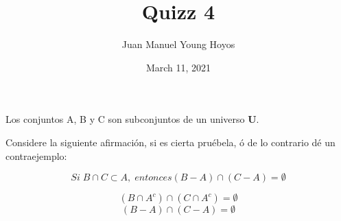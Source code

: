\documentclass[12pt, letterpaper, twoside]{article}
\title{Quizz 4}
\author{Juan Manuel Young Hoyos}
\date{March 11, 2021}
\begin{document}
\maketitle

Los conjuntos A, B y C son subconjuntos de un universo \textbf{U}.

Considere la siguiente afirmación, si es cierta pruébela, ó de lo contrario dé un contraejemplo:

\[ Si\; B \cap C \subset A,\; entonces (B - A) \cap (C - A) = \emptyset \]

\[ (B \cap A^c) \cap (C \cap A^c) = \emptyset\]
\[ (B - A) \cap (C - A) = \emptyset \]
\end{document}

